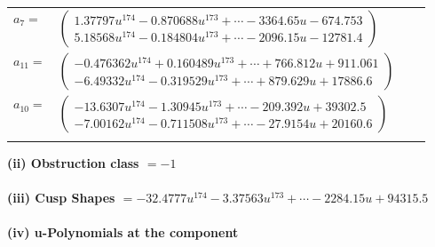 \documentclass[1p]{elsarticle_modified}
\theoremstyle{definition}
\begin{document}
\begin{tabular}{m{7pt} m{180pt} m{7pt} m{180pt} }
\flushright $a_{7}=$&$\begin{pmatrix}1.37797 u^{174}-0.870688 u^{173}+\cdots-3364.65 u-674.753\\5.18568 u^{174}-0.184804 u^{173}+\cdots-2096.15 u-12781.4\end{pmatrix}$ \\
\flushright $a_{11}=$&$\begin{pmatrix}-0.476362 u^{174}+0.160489 u^{173}+\cdots+766.812 u+911.061\\-6.49332 u^{174}-0.319529 u^{173}+\cdots+879.629 u+17886.6\end{pmatrix}$ \\
\flushright $a_{10}=$&$\begin{pmatrix}-13.6307 u^{174}-1.30945 u^{173}+\cdots-209.392 u+39302.5\\-7.00162 u^{174}-0.711508 u^{173}+\cdots-27.9154 u+20160.6\end{pmatrix}$\\&\end{tabular}
\flushleft \textbf{(ii) Obstruction class $= -1$}\\~\\
\flushleft \textbf{(iii) Cusp Shapes $= -32.4777 u^{174}-3.37563 u^{173}+\cdots-2284.15 u+94315.5$}\\~\\
\newpage\renewcommand{\arraystretch}{1}
\flushleft \textbf{(iv) u-Polynomials at the component}\newline \\
\end{document}
